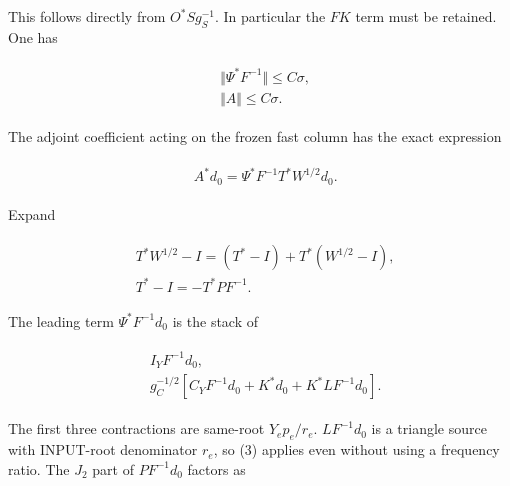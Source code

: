 This follows directly from \(O^{*}Sg_{S}^{-1}\). In particular the
\(F K\) term must be retained. One has

\begin{gather*}
\begin{aligned}
& \Vert \Psi ^{*}F^{-1}\Vert  \le  C \sigma , \\
& \Vert A\Vert  \le  C \sigma .
\end{aligned}\tag{11}
\end{gather*}

The adjoint coefficient acting on the frozen fast column has the exact
expression

\begin{gather*}
\begin{aligned}
& A^{*} d_{0}=\Psi ^{*}F^{-1} T^{*}W^{1/2}d_{0}.
\end{aligned}\tag{12}
\end{gather*}

Expand

\begin{gather*}
\begin{aligned}
& T^{*}W^{1/2}-I=(T^{*}-I)+T^{*}(W^{1/2}-I), \\
& T^{*}-I=-T^{*} P F^{-1}.
\end{aligned}\tag{13}
\end{gather*}

The leading term \(\Psi ^{*}F^{-1} d_{0}\) is the stack of

\begin{gather*}
\begin{aligned}
& I_{Y} F^{-1} d_{0}, \\
& g_{C}^{-1/2}[C_{Y} F^{-1} d_{0}+K^{*} d_{0}+K^{*} L F^{-1} d_{0}].
\end{aligned}\tag{14}
\end{gather*}

The first three contractions are same-root \(Y_{e} p_{e}/r_{e}\).
\(L F^{-1} d_{0}\) is a triangle source with INPUT-root denominator
\(r_{e}\), so (3) applies even without using a frequency ratio. The
\(J_{2}\) part of \(P F^{-1} d_{0}\) factors as

